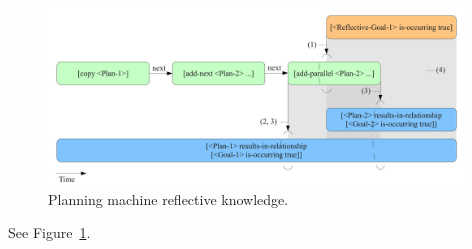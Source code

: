 \begin{figure}[bth]
  \center
  \includegraphics[width=11cm]{gfx/planning_machine_reflective_knowledge}
  \caption[Planning machine reflective knowledge]{Planning machine reflective knowledge.}
  \label{fig:planning_machine_reflective_knowledge}
\end{figure}

See Figure~\ref{fig:planning_machine_reflective_knowledge}.



